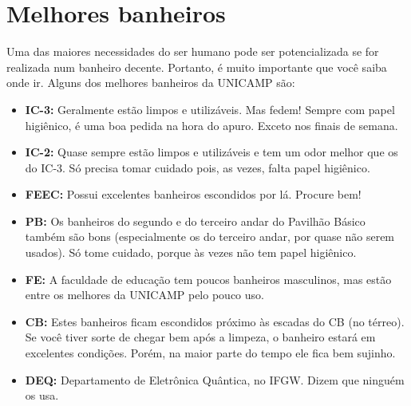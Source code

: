 \section{Melhores banheiros}
Uma das maiores necessidades do ser humano pode ser potencializada se for
realizada num banheiro decente. Portanto, é muito importante que você saiba onde
ir. Alguns dos melhores banheiros da UNICAMP são:

\begin{itemize}
\item  \textbf{IC-3:} Geralmente estão limpos e utilizáveis. Mas fedem! Sempre com papel higiênico, é uma boa pedida na hora do apuro. Exceto nos finais de semana.
\end{itemize}

\begin{itemize}
\item  \textbf{IC-2:} Quase sempre estão limpos e utilizáveis e tem um odor melhor que os do IC-3. Só precisa tomar cuidado pois, as vezes, falta papel higiênico.
\end{itemize}

\begin{itemize}
\item  \textbf{FEEC:} Possui excelentes banheiros escondidos por lá. Procure bem!
\end{itemize}

\begin{itemize}
\item  \textbf{PB:} Os banheiros do segundo e do terceiro andar do Pavilhão Básico também são bons (especialmente os do terceiro andar, por quase não serem usados). Só tome cuidado, porque às vezes não tem papel higiênico.
\end{itemize}

\begin{itemize}
\item  \textbf{FE:} A faculdade de educação tem poucos banheiros masculinos, mas estão entre os melhores da UNICAMP pelo pouco uso.
\end{itemize}

\begin{itemize}
\item  \textbf{CB:} Estes banheiros ficam escondidos próximo às escadas do CB (no térreo). Se você tiver sorte de chegar bem após a limpeza, o banheiro estará em excelentes condições. Porém, na maior parte do tempo ele fica bem sujinho.
\end{itemize}

\begin{itemize}
\item  \textbf{DEQ:} Departamento de Eletrônica Quântica, no IFGW. Dizem que ninguém os usa.
\end{itemize}

